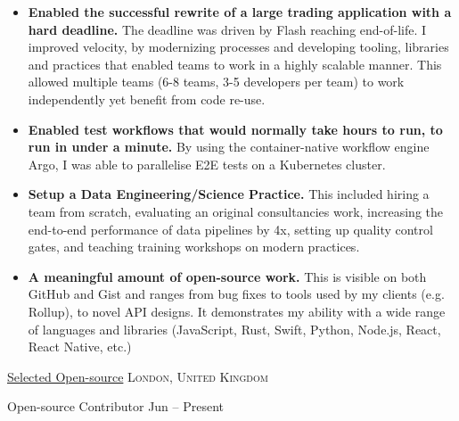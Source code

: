\documentclass[10pt,a4paper]{article}
\begin{document}
\begin{indentsection}
\item
\begin{itemize}[leftmargin=0cm]

    \item \textbf{Enabled the successful rewrite of a large trading application with a hard deadline.} The deadline was driven by Flash reaching end-of-life. I improved velocity, by modernizing processes and developing tooling, libraries and practices that enabled teams to work in a highly scalable manner. This allowed multiple teams (6-8 teams, 3-5 developers per team) to work independently yet benefit from code re-use.

    \item \textbf{Enabled test workflows that would normally take hours to run, to run in under a minute.} By using the container-native workflow engine Argo, I was able to parallelise E2E tests on a Kubernetes cluster.

    \item \textbf{Setup a Data Engineering/Science Practice.} This included hiring a team from scratch, evaluating an original consultancies work, increasing the end-to-end performance of data pipelines by 4x, setting up quality control gates, and teaching training workshops on modern practices.

    \item \textbf{A meaningful amount of open-source work.} This is visible on both GitHub and Gist and ranges from bug fixes to tools used by my clients (e.g. Rollup), to novel API designs. It demonstrates my ability with a wide range of languages and libraries (JavaScript, Rust, Swift, Python, Node.js, React, React Native, etc.)

\end{itemize}
\end{indentsection}


\headedsection  %
  {\href{http://github.com/sebinsua}{Selected Open-source}}
  {\textsc{London, United Kingdom}} {%

  \headedsubsection  %
    {Open-source Contributor}
    {Jun  -- Present}
    {}
}
\end{document}
